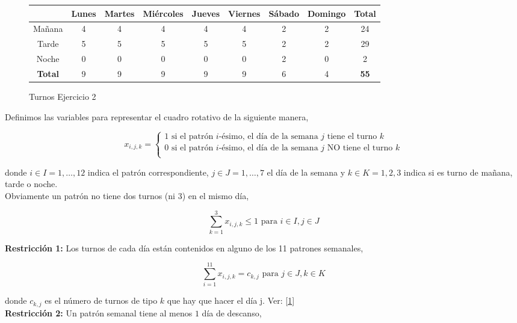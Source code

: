 \documentclass[a4paper,12pt]{article}
\begin{document}
\begin{figure}[h!]
\centering
\begin{tabular}{| c | c | c | c | c | c | c | c | c |}
\hline
& Lunes & Martes & Mi\'ercoles & Jueves & Viernes & S\'abado & Domingo & \textbf{Total}\\
\hline
\hline
Ma\~nana & 4 & 4 & 4 & 4 & 4 & 2 & 2 & 24\\
\hline
Tarde & 5 & 5 & 5 & 5 & 5 & 2 & 2 & 29\\
\hline
Noche & 0 & 0 & 0 & 0 & 0 & 2 & 0 & 2\\
\hline
\textbf{Total} & 9 & 9 & 9 & 9 & 9 & 6 & 4 & \textbf{55}\\
\hline
\end{tabular}
\caption{Turnos Ejercicio 2}
\label{turnos}
\end{figure}

Definimos las variables para representar el cuadro rotativo de la siguiente manera,	
	
	\begin{equation*}
	x_{i,j,k} = \left\lbrace \begin{array}{l}
		1 \text{ si el patr\'on } i\text{-\'esimo, el d\'ia de la semana } j \text{  tiene el turno } k \\
		0 \text{ si el patr\'on } i\text{-\'esimo, el d\'ia de la semana } j \text{  NO tiene el turno } k \\
	\end{array}
	\right. 
	\end{equation*}

donde $i\in I={1,\dots, 12}$ indica el patr\'on correspondiente, $j\in J={1,\dots, 7}$ el d\'ia de la semana y $k\in K={1,2,3}$ indica si es turno de mañana, tarde o noche.\\

Obviamente un patr\'on no tiene dos turnos (ni 3) en el mismo d\'ia,

$$ \sum_{k=1}^{3} x_{i,j,k} \leq 1 \text{ para } i\in I, j\in J$$

\textbf{Restricci\'on 1:} Los turnos de cada d\'ia est\'an contenidos en alguno de los 11 patrones semanales,

$$ \sum_{i=1}^{11} x_{i,j,k} = c_{k,j} \text{ para } j\in J, k\in K$$

donde $c_{k,j}$ es el n\'umero de turnos de tipo $k$ que hay que hacer el d\'ia j. Ver: [\ref{turnos}] \\

\textbf{Restricci\'on 2:} Un patr\'on semanal tiene al menos $1$ d\'ia de descanso,
\end{document}
